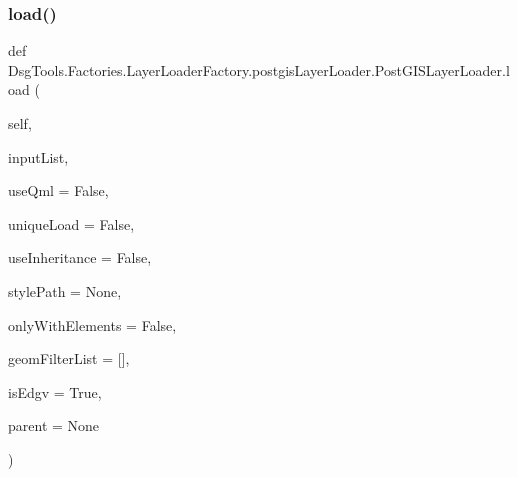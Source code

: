 \subsubsection{\texorpdfstring{load()}{load()}}
{\footnotesize\ttfamily def Dsg\+Tools.\+Factories.\+Layer\+Loader\+Factory.\+postgis\+Layer\+Loader.\+Post\+G\+I\+S\+Layer\+Loader.\+load (\begin{DoxyParamCaption}\item[{}]{self,  }\item[{}]{input\+List,  }\item[{}]{use\+Qml = {\ttfamily False},  }\item[{}]{unique\+Load = {\ttfamily False},  }\item[{}]{use\+Inheritance = {\ttfamily False},  }\item[{}]{style\+Path = {\ttfamily None},  }\item[{}]{only\+With\+Elements = {\ttfamily False},  }\item[{}]{geom\+Filter\+List = {\ttfamily \mbox{[}\mbox{]}},  }\item[{}]{is\+Edgv = {\ttfamily True},  }\item[{}]{parent = {\ttfamily None} }\end{DoxyParamCaption})}

